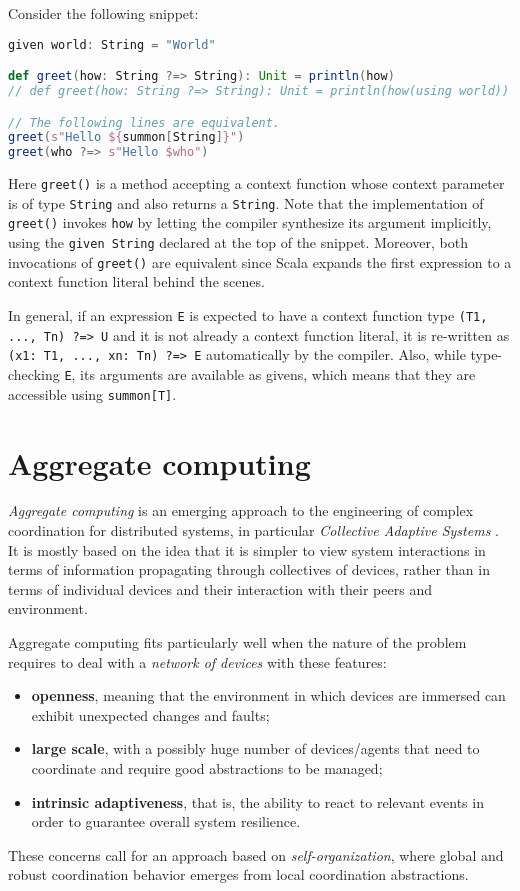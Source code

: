 Consider the following snippet:
%
\begin{lstlisting}[frame=single, language=scala]
given world: String = "World"

def greet(how: String ?=> String): Unit = println(how)
// def greet(how: String ?=> String): Unit = println(how(using world))

// The following lines are equivalent.
greet(s"Hello ${summon[String]}")
greet(who ?=> s"Hello $who")
\end{lstlisting}
%
Here \texttt{greet()} is a method accepting a context function whose context parameter is of type \texttt{String} and also returns a \texttt{String}.
%
Note that the implementation of \texttt{greet()} invokes \texttt{how} by letting the compiler synthesize its argument implicitly, using the \texttt{given String} declared at the top of the snippet.
%
Moreover, both invocations of \texttt{greet()} are equivalent since Scala expands the first expression to a context function literal behind the scenes.

In general, if an expression \texttt{E} is expected to have a context function type \texttt{(T1, ..., Tn) ?=> U} and it is not already a context function literal, it is re-written as \texttt{(x1: T1, ..., xn: Tn) ?=> E} automatically by the compiler.
%
Also, while type-checking \texttt{E}, its arguments are available as givens, which means that they are accessible using \texttt{summon[T]}.

\section{Aggregate computing}

\textit{Aggregate computing} is an emerging approach to the engineering of complex coordination for distributed systems, in particular \textit{Collective Adaptive Systems} \cite{VIROLI2019100486}.
%
It is mostly based on the idea that it is simpler to view system interactions in terms of information propagating through collectives of devices, rather than in terms of individual devices and their interaction with their peers and environment.

Aggregate computing fits particularly well when the nature of the problem requires to deal with a \textit{network of devices} with these features:
%
\begin{itemize}
  \item \textbf{openness}, meaning that the environment in which devices are immersed can exhibit unexpected changes and faults;
  \item \textbf{large scale}, with a possibly huge number of devices/agents that need to coordinate and require good abstractions to be managed;
  \item \textbf{intrinsic adaptiveness}, that is, the ability to react to relevant events in order to guarantee overall system resilience.
\end{itemize}
%
These concerns call for an approach based on \textit{self-organization}, where global and robust coordination behavior emerges from local coordination abstractions.


